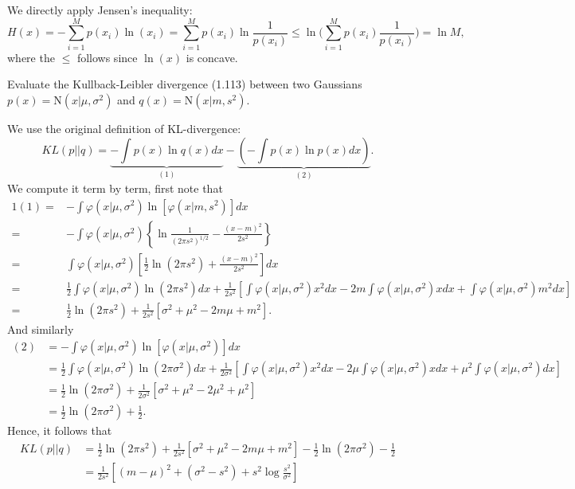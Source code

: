 We directly apply Jensen's inequality: 
\[
H(x)=-\sum_{i=1}^{M}p(x_{i})\ln(x_{i})=\sum_{i=1}^{M}p(x_{i})\ln\frac{1}{p(x_{i})}\leq\ln\bigg(\sum_{i=1}^{M}p(x_{i})\frac{1}{p(x_{i})}\bigg)=\ln M,
\]
where the $\leq$ follows since $\ln(x)$ is concave. \\

\begin{cBoxA}{}
 Evaluate the Kullback-Leibler divergence (1.113) between two Gaussians
$p(x)=\mathrm{N}(x\vert\mu,\sigma^{2})$ and $q(x)=\mathrm{N}(x\vert m,s^{2}).$ 
\end{cBoxA}

We use the original definition of KL-divergence: 
\[
KL(p||q)=\underbrace{-\int p(x)\ln q(x)dx}_{(1)}-\underbrace{\left(-\int p(x)\ln p(x)dx\right)}_{(2)}.
\]
We compute it term by term, first note that 
\begin{alignat*}{1}
(1)= & -\int\varphi(x\vert\mu,\sigma^{2})\ln\left[\varphi(x\vert m,s^{2})\right]dx\\
= & -\int\varphi(x\vert\mu,\sigma^{2})\left\{ \ln\frac{1}{(2\pi s^{2})^{1/2}}-\frac{(x-m)^{2}}{2s^{2}}\right\} \\
= & \int\varphi(x\vert\mu,\sigma^{2})\left[\frac{1}{2}\ln(2\pi s^{2})+\frac{(x-m)^{2}}{2s^{2}}\right]dx\\
= & \frac{1}{2}\int\varphi(x\vert\mu,\sigma^{2})\ln(2\pi s^{2})dx+\frac{1}{2s^{2}}\left[\int\varphi(x\vert\mu,\sigma^{2})x^{2}dx-2m\int\varphi(x\vert\mu,\sigma^{2})xdx+\int\varphi(x\vert\mu,\sigma^{2})m^{2}dx\right]\\
= & \frac{1}{2}\ln(2\pi s^{2})+\frac{1}{2s^{2}}\left[\sigma^{2}+\mu^{2}-2m\mu+m^{2}\right].
\end{alignat*}
And similarly 
\begin{align*}
(2) & =-\int\varphi(x\vert\mu,\sigma^{2})\ln\left[\varphi(x\vert\mu,\sigma^{2})\right]dx\\
 & =\frac{1}{2}\int\varphi(x\vert\mu,\sigma^{2})\ln(2\pi\sigma^{2})dx+\frac{1}{2\sigma^{2}}\left[\int\varphi(x\vert\mu,\sigma^{2})x^{2}dx-2\mu\int\varphi(x\vert\mu,\sigma^{2})xdx+\mu^{2}\int\varphi(x\vert\mu,\sigma^{2})dx\right]\\
 & =\frac{1}{2}\ln(2\pi\sigma^{2})+\frac{1}{2\sigma^{2}}\left[\sigma^{2}+\mu^{2}-2\mu^{2}+\mu^{2}\right]\\
 & =\frac{1}{2}\ln(2\pi\sigma^{2})+\frac{1}{2}.
\end{align*}
Hence, it follows that 
\begin{align*}
KL(p||q) & =\frac{1}{2}\ln(2\pi s^{2})+\frac{1}{2s^{2}}\left[\sigma^{2}+\mu^{2}-2m\mu+m^{2}\right]-\frac{1}{2}\ln(2\pi\sigma^{2})-\frac{1}{2}\\
 & =\frac{1}{2s^{2}}\left[(m-\mu)^{2}+(\sigma^{2}-s^{2})+s^{2}\log\frac{s^{2}}{\sigma^{2}}\right]
\end{align*}

